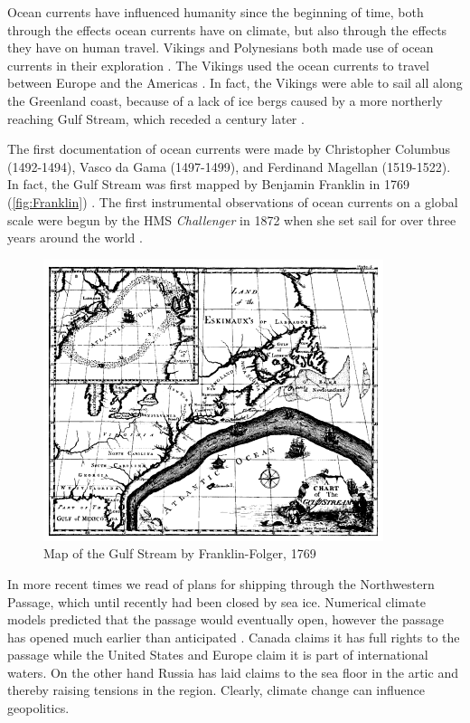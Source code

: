 Ocean currents have influenced humanity since the beginning of time, both through the effects
ocean currents have on climate, but also through the effects they have on human travel. Vikings and
Polynesians both made use of ocean currents in their exploration \cite{Dijkstra08, Ingstad}. The
Vikings used the ocean currents to travel between Europe and the Americas \cite{Ingstad}. In fact,
the Vikings were able to sail all along the Greenland coast, because of a lack of ice bergs caused
by a more northerly reaching Gulf Stream, which receded a century later \cite{Morner95}.

The first documentation of ocean currents were made by Christopher Columbus (1492-1494), Vasco da
Gama (1497-1499), and Ferdinand Magellan (1519-1522). In fact, the Gulf Stream was first mapped by
Benjamin Franklin in 1769 (\autoref{fig:Franklin}) \cite{Dijkstra08, Vallis06}. The first
instrumental observations of ocean currents on a global scale were begun by the HMS
\emph{Challenger} in 1872 when she set sail for over three years around the world \cite{Siedler01}.

\begin{figure}[H] 
  \begin{center}
    \includegraphics[scale=0.5]{Franklin-Folger.png}
    \caption{Map of the Gulf Stream by Franklin-Folger, 1769}
    \label{fig:Franklin}
  \end{center}
\end{figure}

In more recent times we read of plans for shipping through the Northwestern Passage, which until
recently had been closed by sea ice. Numerical climate models predicted that the passage would
eventually open, however the passage has opened much earlier than anticipated \cite{NatGeo}. Canada
claims it has full rights to the passage while the United States and Europe claim it is part of
international waters. On the other hand Russia has laid claims to the sea floor in the artic and
thereby raising tensions in the region. Clearly, climate change can influence geopolitics.  

